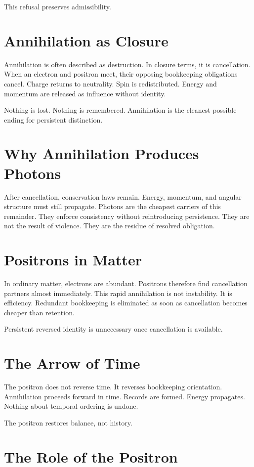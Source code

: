 \documentclass[11pt,twoside,openright]{book}
\begin{document}
This refusal preserves admissibility.

\section*{Annihilation as Closure}

Annihilation is often described as destruction. In closure terms, it is cancellation. When an electron and positron meet, their opposing bookkeeping obligations cancel. Charge returns to neutrality. Spin is redistributed. Energy and momentum are released as influence without identity.

Nothing is lost. Nothing is remembered. Annihilation is the cleanest possible ending for persistent distinction.

\section*{Why Annihilation Produces Photons}

After cancellation, conservation laws remain. Energy, momentum, and angular structure must still propagate. Photons are the cheapest carriers of this remainder. They enforce consistency without reintroducing persistence. They are not the result of violence. They are the residue of resolved obligation.

\section*{Positrons in Matter}

In ordinary matter, electrons are abundant. Positrons therefore find cancellation partners almost immediately. This rapid annihilation is not instability. It is efficiency. Redundant bookkeeping is eliminated as soon as cancellation becomes cheaper than retention.

Persistent reversed identity is unnecessary once cancellation is available.

\section*{The Arrow of Time}

The positron does not reverse time. It reverses bookkeeping orientation. Annihilation proceeds forward in time. Records are formed. Energy propagates. Nothing about temporal ordering is undone.

The positron restores balance, not history.

\section*{The Role of the Positron}
\end{document}

